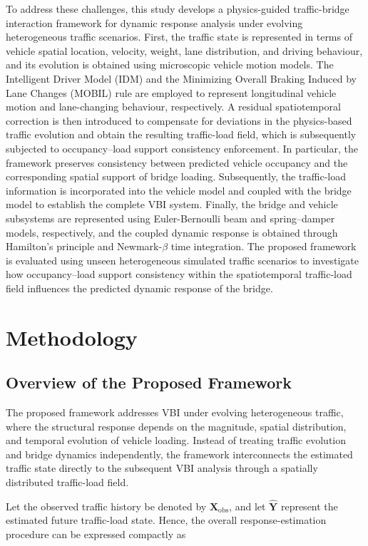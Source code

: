\documentclass[journal]{IEEEtran}
\begin{document}
To address these challenges, this study develops a physics-guided traffic-bridge interaction framework for dynamic response analysis under evolving heterogeneous traffic scenarios. First, the traffic state is represented in terms of vehicle spatial location, velocity, weight, lane distribution, and driving behaviour, and its evolution is obtained using microscopic vehicle motion models. The Intelligent Driver Model (IDM) and the Minimizing Overall Braking Induced by Lane Changes (MOBIL) rule are employed to represent longitudinal vehicle motion and lane-changing behaviour, respectively. A residual spatiotemporal correction is then introduced to compensate for deviations in the physics-based traffic evolution and obtain the resulting traffic-load field, which is subsequently subjected to occupancy–load support consistency enforcement. In particular, the framework preserves consistency between predicted vehicle occupancy and the corresponding spatial support of bridge loading. Subsequently, the traffic-load information is incorporated into the vehicle model and coupled with the bridge model to establish the complete VBI system. Finally, the bridge and vehicle subsystems are represented using Euler-Bernoulli beam and spring--damper models, respectively, and the coupled dynamic response is obtained through Hamilton's principle and Newmark-$\beta$ time integration. The proposed framework is evaluated using unseen heterogeneous simulated traffic scenarios to investigate how occupancy–load support consistency within the spatiotemporal traffic-load field influences the predicted dynamic response of the bridge.


\section{Methodology}
\subsection{Overview of the Proposed Framework}
\label{sec:framework_overview}

The proposed framework addresses VBI under evolving heterogeneous traffic, where the structural response depends on the magnitude, spatial distribution, and temporal evolution of vehicle loading. Instead of treating traffic evolution and bridge dynamics independently, the framework interconnects the estimated traffic state directly to the subsequent VBI analysis through a spatially distributed traffic-load field.

Let the observed traffic history be denoted by $\mathbf{X}_{\mathrm{obs}}$, and let $\widehat{\mathbf{Y}}$ represent the estimated future traffic-load state. Hence, the overall response-estimation procedure can be expressed compactly as
\end{document}

